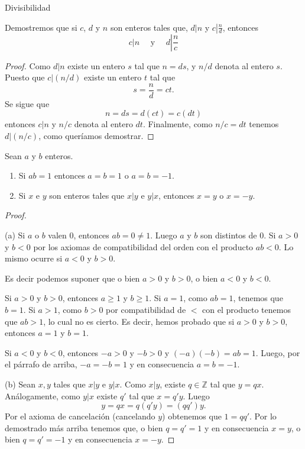 \begin{section}{Divisibilidad}
\begin{ejemplo} Demostremos que si $c$, $d$ y $n$ son enteros tales
que, $d|n$ y $c\left|\frac{n}{d}\right.$, entonces
$$ c|n \quad\text{ y }\quad d\left|\frac{n}{c}\right.$$
\end{ejemplo}
\begin{proof} Como $d|n$ existe un entero $s$ tal que $n=ds$, y
$n/d$ denota al entero $s$. Puesto que $c|(n/d)$ existe un entero
$t$ tal que
$$s=\frac{n}{d} =ct.
$$
Se sigue que
$$
n=ds=d(ct)=c(dt)$$
 entonces $c|n$ y $n/c$ denota al entero $dt$. Finalmente, como
$n/c=dt$ tenemos $d|(n/c)$, como queríamos demostrar.
\end{proof}

\begin{proposicion}\label{pm} Sean $a$ y $b$ enteros.
\begin{enumerate}[label=(\alph*)]
\item Si  $ab=1$ entonces $a=b=1$ o $a=b=-1$. 
\item \label{prop-pm-b}Si $x$ e $y$ son enteros tales que $x|y$ e $y|x$, entonces $x=y$ o $x=-y$.
\end{enumerate}
\end{proposicion}
\begin{proof}
\

\noindent (a) Si $a$ o $b$ valen $0$, entonces $ab=0 \not=1$. Luego $a$ y $b$ son distintos de $0$. Si $a>0$ y $b<0$ por los axiomas de compatibilidad del orden con el producto $ab<0$. Lo mismo ocurre si $a<0$ y $b>0$.

Es decir podemos suponer que o bien $a>0$ y $b>0$, o bien $a<0$ y $b<0$. 

Si  $a>0$ y $b>0$, entonces  $a\ge 1$ y $b\ge 1$. Si $a=1$, como $ab =1$, tenemos que $b = 1$. Si $a>1$, como  $b>0$ por compatibilidad de $<$ con el producto tenemos que $ab>1$, lo cual no es cierto. Es decir, hemos probado que si  $a>0$ y $b>0$, entonces $a=1$ y $b=1$.

Si  $a<0$ y $b<0$, entonces   $-a>0$ y $-b>0$ y $(-a)(-b) = ab =1$. Luego, por el párrafo de arriba, $-a=-b=1$ y en consecuencia $a=b=-1$.


\noindent (b) Sean $x,y$ tales que  $x|y$ e $y|x$. Como $x|y$, existe $q \in \mathbb Z$ tal que $y = qx$. Análogamente, como $y|x$ existe $q'$ tal que $x = q'y$. Luego
$$y = qx = q(q'y) = (qq')y.$$
Por el axioma de cancelación (cancelando $y$) obtenemos que $1 = qq'$. Por lo demostrado más arriba tenemos que, o bien $q=q'=1$ y en consecuencia $x=y$, o bien $q=q'=-1$ y en consecuencia $x=-y$. 
\end{proof}


\end{section}
